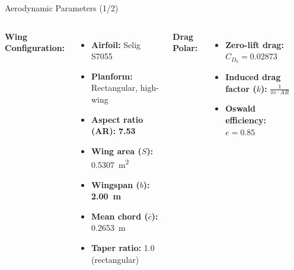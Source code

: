 \documentclass[aspectratio=169,18pt]{beamer}
\begin{document}
\begin{frame}{Aerodynamic Parameters (1/2)}


\begin{columns}[T]
\textbf{\color{navymain}Wing Configuration:}
\begin{itemize}
\item \textbf{Airfoil:} Selig S7055
\item \textbf{Planform:} Rectangular, high-wing
\item \textbf{Aspect ratio (AR):} \textcolor{navydeep}{\textbf{7.53}}
\item \textbf{Wing area ($S$):} \SI{0.5307}{\meter\squared}
\item \textbf{Wingspan ($b$):} \textcolor{navydeep}{\textbf{\SI{2.00}{\meter}}}
\item \textbf{Mean chord ($\bar{c}$):} \SI{0.2653}{\meter}
\item \textbf{Taper ratio:} 1.0 (rectangular)
\end{itemize}


\textbf{\color{navymain}Drag Polar:}
\begin{itemize}
\item \textbf{Zero-lift drag:} $C_{D_0} = 0.02873$
\item \textbf{Induced drag factor ($k$):} $\frac{1}{\pi e \cdot AR}$
\item \textbf{Oswald efficiency:} $e = 0.85$
\end{itemize}

\vspace{0.5cm}
\begin{center}
\end{center}
\end{columns}
\end{frame}
\end{document}
